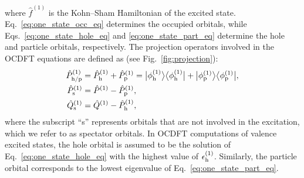 \documentclass[12pt]{article}
\newcommand{\bra}[2][0]
{\ifthenelse{\equal{#1}{0}}{\left\langle #2 \right|}
{\ifthenelse{\equal{#1}{1}}{\big\langle #2 \big|}
{\ifthenelse{\equal{#1}{2}}{\Big\langle #2 \Big|}
{\ifthenelse{\equal{#1}{3}}{\bigg\langle #2 \bigg|}
{\ifthenelse{\equal{#1}{4}}{\Bigg\langle #2 \Bigg|}
{Error}}}}}
}
\newcommand{\ket}[2][0]
{\ifthenelse{\equal{#1}{0}}{\left| #2 \right\rangle}
{\ifthenelse{\equal{#1}{1}}{\big| #2 \big\rangle}
{\ifthenelse{\equal{#1}{2}}{\Big| #2 \Big\rangle}
{\ifthenelse{\equal{#1}{3}}{\bigg| #2 \bigg\rangle}
{\ifthenelse{\equal{#1}{4}}{\Bigg| #2 \Bigg\rangle}
{Error}}}}}
}
\begin{document}
where $\hat{f}^{(1)} $ is the Kohn--Sham Hamiltonian of the excited state.
Eq.~\eqref{eq:one_state_occ_eq} determines the occupied orbitals, while Eqs.~\eqref{eq:one_state_hole_eq} and \eqref{eq:one_state_part_eq} determine the hole and particle orbitals, respectively.
The projection operators involved in the OCDFT equations are defined as (see Fig.~\ref{fig:projection}):
\begin{align}
\hat{P}^{(1)}_{\rm h/p} &= \hat{P}^{(1)}_{\rm h} + \hat{P}^{(1)}_{\rm p} = 
\ket[1]{\phi^{(1)}_{\rm h}}\bra[1]{\phi^{(1)}_{\rm h}}
+\ket[1]{\phi^{(1)}_{\rm p}}\bra[1]{\phi^{(1)}_{\rm p}},\\
\hat{P}^{(1)}_{\rm s} &= \hat{P}^{(1)} - \hat{P}^{(1)}_{\rm p},\\
\hat{Q}^{(1)}_{\rm s} &= \hat{Q}^{(1)} - \hat{P}^{(1)}_{\rm h},
\end{align}
where the subscript ``s'' represents orbitals that are not involved in the excitation, which we refer to as spectator orbitals.
In OCDFT computations of valence excited states, the hole orbital is assumed to be the solution of Eq.~\eqref{eq:one_state_hole_eq} with the highest value of $\epsilon^{(1)}_{\rm h}$.  Similarly, the particle orbital corresponds to the lowest eigenvalue of Eq.~\eqref{eq:one_state_part_eq}.
\end{document}
